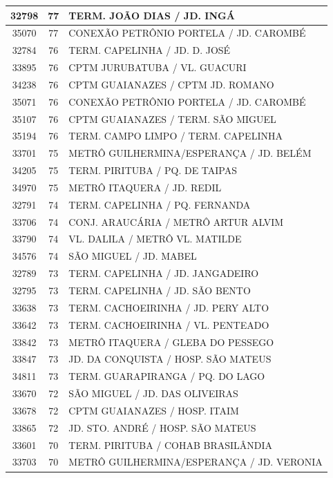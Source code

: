 \documentclass[
	12pt,				%
	oneside,			%
	a4paper,			%
	english,			%
	brazil				%
	]{abntex2ppgsi}
\begin{document}
{{\begin{apendicesenv}
\begin{longtable}{c|c|p{7cm}}
 \hline 
32798 &	77 &	TERM. JOÃO DIAS / JD. INGÁ \\ 
 \hline 
35070 &	77 &	CONEXÃO PETRÔNIO PORTELA / JD. CAROMBÉ \\ 
 \hline 
32784 &	76 &	TERM. CAPELINHA / JD. D. JOSÉ \\ 
 \hline 
33895 &	76 &	CPTM JURUBATUBA / VL. GUACURI \\ 
 \hline 
34238 &	76 &	CPTM GUAIANAZES / CPTM JD. ROMANO \\ 
 \hline 
35071 &	76 &	CONEXÃO PETRÔNIO PORTELA / JD. CAROMBÉ \\ 
 \hline 
35107 &	76 &	CPTM GUAIANAZES / TERM. SÃO MIGUEL \\ 
 \hline 
35194 &	76 &	TERM. CAMPO LIMPO / TERM. CAPELINHA \\ 
 \hline 
33701 &	75 &	METRÔ GUILHERMINA/ESPERANÇA / JD. BELÉM \\ 
 \hline 
34205 &	75 &	TERM. PIRITUBA / PQ. DE TAIPAS \\ 
 \hline 
34970 &	75 &	METRÔ ITAQUERA / JD. REDIL \\ 
 \hline 
32791 &	74 &	TERM. CAPELINHA / PQ. FERNANDA \\ 
 \hline 
33706 &	74 &	CONJ. ARAUCÁRIA / METRÔ ARTUR ALVIM \\ 
 \hline 
33790 &	74 &	VL. DALILA / METRÔ VL. MATILDE \\ 
 \hline 
34576 &	74 &	SÃO MIGUEL / JD. MABEL \\ 
 \hline 
32789 &	73 &	TERM. CAPELINHA / JD. JANGADEIRO \\ 
 \hline 
32795 &	73 &	TERM. CAPELINHA / JD. SÃO BENTO \\ 
 \hline 
33638 &	73 &	TERM. CACHOEIRINHA / JD. PERY ALTO \\ 
 \hline 
33642 &	73 &	TERM. CACHOEIRINHA / VL. PENTEADO \\ 
 \hline 
33842 &	73 &	METRÔ ITAQUERA / GLEBA DO PESSEGO \\ 
 \hline 
33847 &	73 &	JD. DA CONQUISTA / HOSP. SÃO MATEUS \\ 
 \hline 
34811 &	73 &	TERM. GUARAPIRANGA / PQ. DO LAGO \\ 
 \hline 
33670 &	72 &	SÃO MIGUEL / JD. DAS OLIVEIRAS \\ 
 \hline 
33678 &	72 &	CPTM GUAIANAZES / HOSP. ITAIM \\ 
 \hline 
33865 &	72 &	JD. STO. ANDRÉ / HOSP. SÃO MATEUS \\ 
 \hline 
33601 &	70 &	TERM. PIRITUBA / COHAB BRASILÂNDIA \\ 
 \hline 
33703 &	70 &	METRÔ GUILHERMINA/ESPERANÇA / JD. VERONIA \\ 

\end{longtable}
\end{apendicesenv}}}
\end{document}
